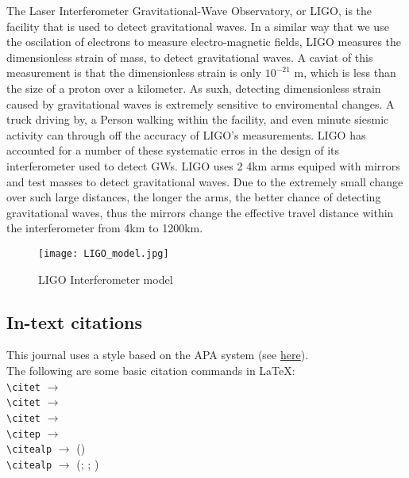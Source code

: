 \documentclass{article}
\begin{document}
The Laser Interferometer Gravitational-Wave Observatory, or LIGO, is the facility that is used to detect gravitational waves.
In a similar way that we use the oscilation of electrons to measure electro-magnetic fields, LIGO measures the dimensionless strain of mass, to detect
gravitational waves. A caviat of this measurement is that the dimensionless strain is only $10^{-21}$ m, which is 
less than the size of a proton over a kilometer. As suxh, detecting dimensionless strain caused by gravitational waves is extremely sensitive to 
enviromental changes. A truck driving by, a Person walking within the facility, and even minute siesmic activity can through off the accuracy of LIGO's measurements. LIGO has accounted for
a number of these systematic erros in the design of its interferometer used to detect GWs. LIGO uses 2 4km arms equiped with mirrors and test masses to detect 
gravitational waves. Due to the extremely small change over such large distances, the longer the arms, the better chance of detecting gravitational waves, thus the mirrors 
change the effective travel distance within the interferometer from 4km to 1200km. 
\begin{minipage}
\begin{figure}
    \centering
    \texttt{[image: LIGO\_model.jpg]}
    \caption{\label{fig1} LIGO Interferometer model}
\end{figure}
\end{minipage}



\subsection{In-text citations}
This journal uses a style based on the APA system (see \href{https://openhumanitiesdata.metajnl.com/about/submissions/#References}{here}). \\
The following are some basic citation commands in \LaTeX: \\

\noindent
\verb|\citet| $\rightarrow$ \citet{jenset&mcgil}\\
\verb|\citet| $\rightarrow$ \citet{australiashealth}\\
\verb|\citet| $\rightarrow$ \citet{shree-a}\\
\verb|\citep| $\rightarrow$ \citep{fabricius-hansen2012b}\\
\verb|\citealp| $\rightarrow$ (\citealp{eckhoff2018a})\\
\verb|\citealp| $\rightarrow$ (\citealp{eckhoff2018a}; \citealp{fabricius-hansen2012b}; \citealp{shree-a})\\
\end{document}
